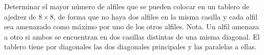 Determinar el mayor número de alfiles que se pueden colocar en un tablero de ajedrez de $8 \times 8$, de forma que no haya dos alfiles en la misma casilla y cada alfil sea amenazado como máximo por uno de los otros alfiles. \newline 
Nota. Un alfil amenaza a otro si ambos se encuentran en dos casillas distintas de una misma diagonal. El tablero tiene por diagonales las dos diagonales principales y las paralelas a ellas.
